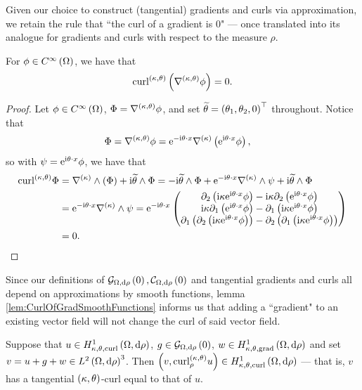 Given our choice to construct (tangential) gradients and curls via approximation, we retain the rule that ``the curl of a gradient is 0" --- once translated into its analogue for gradients and curls with respect to the measure $\rho$.
\begin{lemma} \label{lem:CurlOfGradSmoothFunctions}
	For $\phi\in C^{\infty}\left( \Omega \right)$, we have that
	\begin{align*}
		\mathrm{curl}_{}^{\left( \kappa, \theta \right)}\left( \nabla^{\left( \kappa, \theta \right)}\phi \right) = 0.
	\end{align*}
\end{lemma}
\begin{proof}
	Let $\phi\in C^{\infty}\left( \Omega \right)$, $\Phi = \nabla^{\left( \kappa, \theta \right)}\phi$, and set $\widetilde{\theta} = \left( \theta_1, \theta_2, 0 \right)^\top$ throughout.
	Notice that
	\begin{align*}
		\Phi = \nabla^{\left( \kappa, \theta \right)}\phi &= \mathrm{e}^{-\mathrm{i}\theta\cdot x}\nabla^{(\kappa)}\left(  \mathrm{e}^{\mathrm{i}\theta\cdot x}\phi  \right),
	\end{align*}
	so with $\psi = \mathrm{e}^{\mathrm{i}\theta\cdot x}\phi$, we have that
	\begin{align*}
		\mathrm{curl}_{}^{\left( \kappa, \theta \right)}\Phi 
		&= \nabla^{(\kappa)}\wedge\left(  \Phi  \right) + \mathrm{i}\widetilde{\theta}\wedge\Phi
		= -\mathrm{i}\widetilde{\theta}\wedge\Phi + \mathrm{e}^{-\mathrm{i}\theta\cdot x}\nabla^{(\kappa)}\wedge\psi + \mathrm{i}\widetilde{\theta}\wedge\Phi \\
		&= \mathrm{e}^{-\mathrm{i}\theta\cdot x}\nabla^{(\kappa)}\wedge\psi
		= \mathrm{e}^{-\mathrm{i}\theta\cdot x} 
		\begin{pmatrix}
			\partial_2\left(  \mathrm{i}\kappa \mathrm{e}^{\mathrm{i}\theta\cdot x}\phi  \right) - \mathrm{i}\kappa\partial_2\left(  \mathrm{e}^{\mathrm{i}\theta\cdot x}\phi  \right) \\
			\mathrm{i}\kappa\partial_1\left(  \mathrm{e}^{\mathrm{i}\theta\cdot x}\phi  \right) - \partial_1\left(  \mathrm{i}\kappa \mathrm{e}^{\mathrm{i}\theta\cdot x}\phi  \right) \\
			\partial_1\left(  \partial_2\left( \mathrm{i}\kappa\mathrm{e}^{\mathrm{i}\theta\cdot x}\phi \right)  \right) - \partial_2\left(  \partial_1\left( \mathrm{i}\kappa\mathrm{e}^{\mathrm{i}\theta\cdot x}\phi \right)  \right)
		\end{pmatrix} \\
		&= 0.
	\end{align*}
\end{proof}
Since our definitions of $\mathcal{G}_{ \Omega, \mathrm{d}\rho}\left( 0 \right), \mathcal{C}_{ \Omega, \mathrm{d}\rho}\left( 0 \right)$ and tangential gradients and curls all depend on approximations by smooth functions, lemma \ref{lem:CurlOfGradSmoothFunctions} informs us that adding a ``gradient" to an existing vector field will not change the curl of said vector field.
\begin{prop} \label{prop:CurlIgnoresGradients}
	Suppose that $u\in H^1_{\kappa,\theta,\mathrm{curl}}\left( \Omega, \mathrm{d}\rho \right)$, $g\in\mathcal{G}_{ \Omega, \mathrm{d}\rho}\left( 0 \right)$, $w\in H^1_{\kappa,\theta,\mathrm{grad}}\left( \Omega, \mathrm{d}\rho \right)$ and set $v = u + g + w\in L^{2}\left( \Omega,\mathrm{d}\rho \right)^3$. 
	Then $\left( v, \mathrm{curl}_{\rho}^{\left( \kappa, \theta \right)}u \right)\in H^1_{\kappa,\theta,\mathrm{curl}}\left( \Omega, \mathrm{d}\rho \right)$ --- that is, $v$ has a tangential $\left( \kappa, \theta \right)$-curl equal to that of $u$.
\end{prop}
